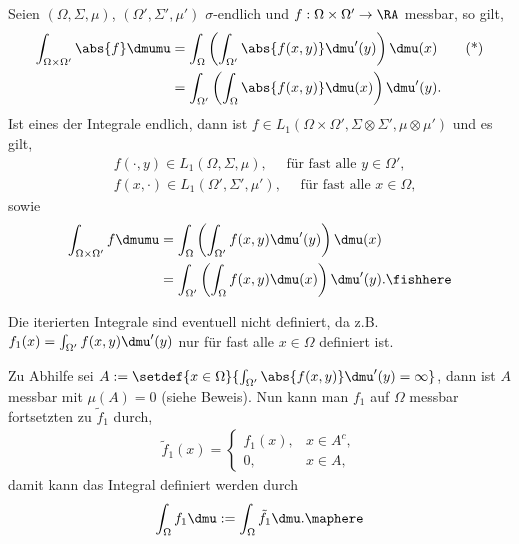 \begin{prop}
\label{prop:3.53}
Seien $(\Omega,\Sigma,\mu)$, $(\Omega',\Sigma',\mu')$ $\sigma$-endlich und
$f:\Omega\times\Omega'\to\RA$ messbar, so gilt,
\begin{align*}
\int_{\Omega\times\Omega'} \abs{f}\dmumu &= 
\int_\Omega\left(\int_{\Omega'} \abs{f(x,y)} \dmu'(y) \right) \dmu(x)\tag{*}\\
&= \int_{\Omega'}\left(\int_{\Omega} \abs{f(x,y)} \dmu(x) \right) \dmu'(y).
\end{align*}
Ist eines der Integrale endlich, dann ist $f\in
L_1(\Omega\times\Omega',\Sigma\otimes\Sigma',\mu\otimes\mu')$ und es gilt,
\begin{align*}
&f(\cdot,y)\in L_1(\Omega,\Sigma,\mu),\quad \text{ für fast alle }
y\in\Omega',\tag{**}\\
&f(x,\cdot)\in L_1(\Omega',\Sigma',\mu'),\quad \text{ für fast alle }
x\in\Omega,
\end{align*}
sowie
\begin{align*}
\int_{\Omega\times\Omega'} f\dmumu &= \int_\Omega\left(
\int_{\Omega'} f(x,y) \dmu'(y) \right) \dmu(x)
\\ &= \int_{\Omega'} \left( \int_\Omega f(x,y) \dmu(x) 
\right) \dmu'(y).\fishhere
\end{align*}
\end{prop}
\begin{bemn}
Die iterierten Integrale sind eventuell nicht definiert, da z.B. $f_1(x) =
\int_{\Omega'} f(x,y)\dmu'(y)$ nur für fast alle $x\in\Omega$ definiert ist.

Zu Abhilfe sei $A:=\setdef{x\in\Omega}{\int_{\Omega'} \abs{f(x,y)} \dmu'(y) =
\infty}$, dann ist $A$ messbar mit $\mu(A) = 0$ (siehe Beweis). Nun kann man
$f_1$ auf $\Omega$ messbar fortsetzten zu $\tilde{f}_1$ durch,
\begin{align*}
\tilde{f}_1(x) = \begin{cases}
f_1(x), & x\in A^c,\\
0, & x\in A,
\end{cases}
\end{align*}
damit kann das Integral definiert werden durch
\begin{align*}
\int_\Omega f_1\dmu := \int_\Omega \tilde{f}_1\dmu.\maphere
\end{align*}
\end{bemn}
